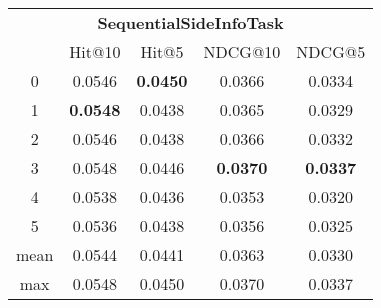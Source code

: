 \documentclass{article}
\begin{document}
 

\begin{tabular}{c|cccc}

\multicolumn{5}{c}{\textbf{SequentialSideInfoTask}} \\
\noalign{\smallskip}
\noalign{\smallskip}
\toprule
\multicolumn{1}{c}{Template ID} & \multicolumn{1}{|c}{Hit@10} & \multicolumn{1}{c}{Hit@5} & \multicolumn{1}{c}{NDCG@10} & \multicolumn{1}{c}{NDCG@5} \\
\midrule
0 & 0.0546 & \textbf{0.0450} & 0.0366 & 0.0334 \\
1 & \textbf{0.0548} & 0.0438 & 0.0365 & 0.0329 \\
2 & 0.0546 & 0.0438 & 0.0366 & 0.0332 \\
3 & 0.0548 & 0.0446 & \textbf{0.0370} & \textbf{0.0337} \\
4 & 0.0538 & 0.0436 & 0.0353 & 0.0320 \\
5 & 0.0536 & 0.0438 & 0.0356 & 0.0325 \\
\midrule
mean & 0.0544 & 0.0441 & 0.0363 & 0.0330 \\
max & 0.0548 & 0.0450 & 0.0370 & 0.0337 \\
\bottomrule

\end{tabular}
\end{document}
